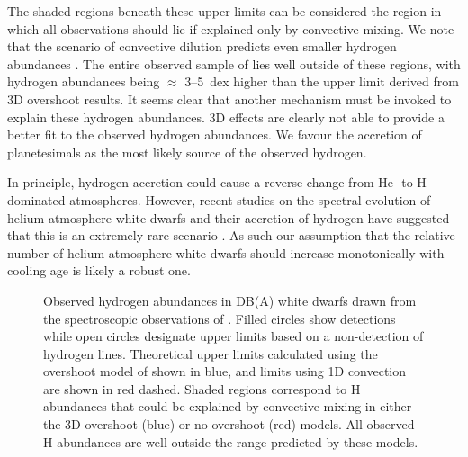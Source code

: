 \documentclass[a4paper,fleqn,usenatbib]{mnras}
\begin{document}
The shaded regions beneath these upper limits can be considered the region in which all observations should lie if explained only by convective mixing. We note that the scenario of convective dilution predicts even smaller hydrogen abundances \citep{genest-Beaulieu19}. The entire observed sample of \citet{rolland18} lies well outside of these regions, with hydrogen abundances being $\approx$ 3--5~dex higher than the upper limit derived from 3D overshoot results. It seems clear that another mechanism must be invoked to explain these hydrogen abundances. 3D effects are clearly not able to provide a better fit to the observed hydrogen abundances. We favour the accretion of planetesimals as the most likely source of the observed hydrogen. 

In principle, hydrogen accretion could cause a reverse change from He- to H-dominated atmospheres. However, recent studies on the spectral evolution of helium atmosphere white dwarfs and their accretion of hydrogen have suggested that this is an extremely rare scenario \citep{ngf17,rolland18}. As such our assumption that the relative number of helium-atmosphere white dwarfs should increase monotonically with cooling age is likely a robust one.

\begin{figure}
 \centering
 \caption{Observed hydrogen abundances in DB(A) white dwarfs drawn from the spectroscopic observations of \citet{rolland18}. Filled circles show detections while open circles designate upper limits based on a non-detection of hydrogen lines. Theoretical upper limits calculated using the overshoot model of \citet{cunningham19} shown in blue, and limits using 1D convection \citep{koester09} are shown in red dashed. Shaded regions correspond to H abundances that could be explained by convective mixing in either the 3D overshoot (blue) or no overshoot (red) models. All observed H-abundances are well outside the range predicted by these models.}
 \label{fg:H-limit}
\end{figure}
\end{document}

